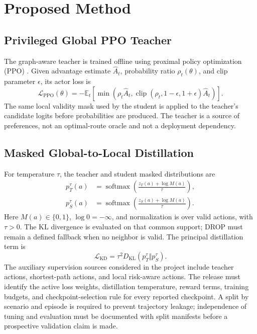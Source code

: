 \documentclass[drones,article,submit,moreauthors]{Definitions/mdpi}
\newcommand{\E}{\mathbb{E}}\newcommand{\R}{\mathbb{R}}
\newcommand{\AuthorCheck}[1]{\textcolor{ReviewBlue}{#1}}
\begin{document}
\section{Proposed Method}

\subsection{Privileged Global PPO Teacher}

The graph-aware teacher is trained offline using proximal policy optimization (PPO) \cite{schulman2017ppo}. Given advantage estimate $\hat A_t$, probability ratio $\rho_t(\theta)$, and clip parameter $\epsilon$, its actor loss is
\begin{equation}
\mathcal{L}_{\mathrm{PPO}}(\theta)=-\E_t\!\left[\min\left(\rho_t\hat A_t,\operatorname{clip}(\rho_t,1-\epsilon,1+\epsilon)\hat A_t\right)\right].
\end{equation}
The same local validity mask used by the student is applied to the teacher's candidate logits before probabilities are produced. The teacher is a source of preferences, not an optimal-route oracle and not a deployment dependency.

\subsection{Masked Global-to-Local Distillation}

For temperature $\tau$, the teacher and student masked distributions are
\begin{equation}
\begin{aligned}
p_T^\tau(a)&=\operatorname{softmax}\!\left(\frac{z_T(a)+\log M(a)}{\tau}\right),\\
p_S^\tau(a)&=\operatorname{softmax}\!\left(\frac{z_S(a)+\log M(a)}{\tau}\right).
\end{aligned}
\end{equation}
Here $M(a)\in\{0,1\}$, $\log 0=-\infty$, and normalization is over valid actions, with $\tau>0$. The KL divergence is evaluated on that common support; DROP must remain a defined fallback when no neighbor is valid. The principal distillation term is \cite{hinton2015distilling}
\begin{equation}
\mathcal{L}_{\mathrm{KD}}=\tau^2D_{\mathrm{KL}}(p_T^\tau\Vert p_S^\tau).
\end{equation}
The auxiliary supervision sources considered in the project include teacher actions, shortest-path actions, and local risk-aware actions. \AuthorCheck{The release must identify the active loss weights, distillation temperature, reward terms, training budgets, and checkpoint-selection rule for every reported checkpoint.} A split by scenario and episode is required to prevent trajectory leakage; independence of tuning and evaluation must be documented with split manifests before a prospective validation claim is made.
\end{document}
